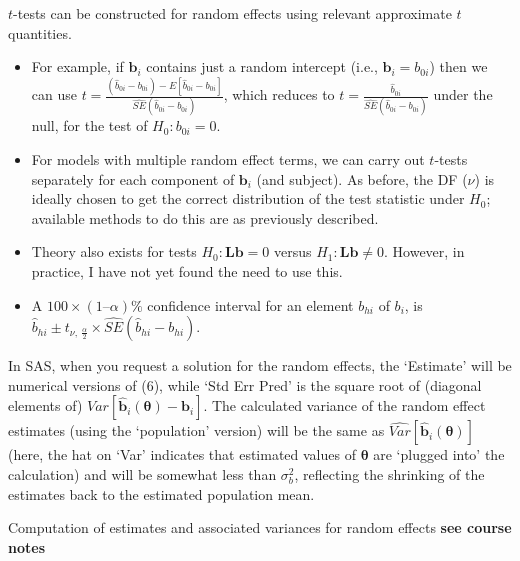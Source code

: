\documentclass[
  9pt,
  ignorenonframetext,
]{beamer}
\begin{document}
\begin{frame}{}
\protect\hypertarget{section-4}{}
\(t\)-tests can be constructed for random effects using relevant
approximate \(t\) quantities.

\begin{itemize}
\item
  For example, if \(\pmb b_i\) contains just a random intercept (i.e.,
  \(\pmb b_i= b_{0i}\)) then we can use
  \(t = \frac {(\hat b_{0i} - b_{0i}) - E[\hat b_{0i} - b_{0i}]} {\widehat {SE} (\hat b_{0i} - b_{0i})}\),
  which reduces to
  \(t=\frac {{\hat b}_{0i}} {\widehat {SE} (\hat b_{0i} - b_{0i})}\)
  under the null, for the test of \(H_0: b_{0i}=0\).
\item
  For models with multiple random effect terms, we can carry out
  \(t\)-tests separately for each component of \(\pmb b_i\) (and
  subject). As before, the DF (\(\nu\)) is ideally chosen to get the
  correct distribution of the test statistic under \(H_0\); available
  methods to do this are as previously described.
\item
  Theory also exists for tests \(H_0: \pmb {Lb} = 0\) versus
  \(H_1: \pmb {Lb} \neq 0\). However, in practice, I have not yet found
  the need to use this.
\item
  A \(100 \times (1 – \alpha) \%\) confidence interval for an element
  \(b_{hi}\) of \(b_i\), is
  \(\hat b_{hi} \pm t_{\nu,\ \frac \alpha 2} \times \widehat {SE} (\hat b_{hi} - b_{hi})\).
\end{itemize}
\end{frame}

\begin{frame}{}
\protect\hypertarget{section-5}{}
In SAS, when you request a solution for the random effects, the
`Estimate' will be numerical versions of (6), while `Std Err Pred' is
the square root of (diagonal elements of)
\(Var[ \pmb {\hat b}_i (\pmb \theta) - \pmb b_i]\). The calculated
variance of the random effect estimates (using the `population' version)
will be the same as \(\widehat {Var} [\pmb {\hat b}_i (\pmb \theta)]\)
(here, the hat on `Var' indicates that estimated values of
\(\pmb \theta\) are `plugged into' the calculation) and will be somewhat
less than \(\sigma_b^2\), reflecting the shrinking of the estimates back
to the estimated population mean.
\end{frame}

\begin{frame}{Computation of estimates and associated variances for
random effects}
\protect\hypertarget{computation-of-estimates-and-associated-variances-for-random-effects}{}
\textbf{see course notes}
\end{frame}
\end{document}
